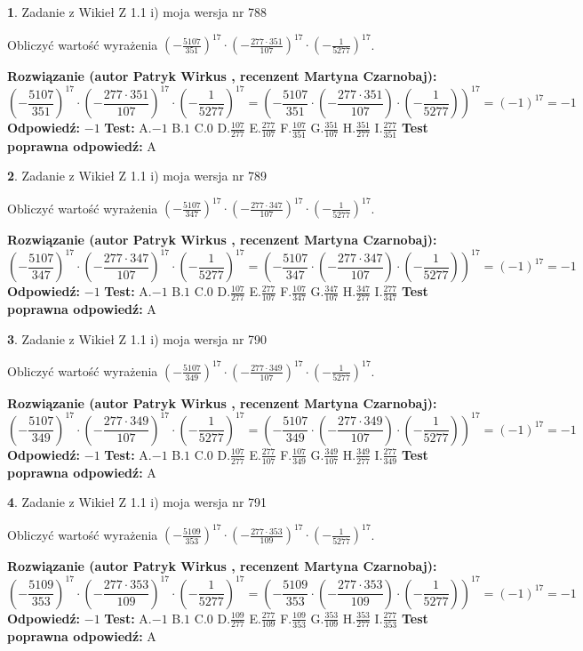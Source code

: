 \documentclass[12pt, a4paper]{article}
\theoremstyle{definition} %
\newtheorem{zad}{}
\newcommand{\zadStart}[1]{\begin{zad}#1\newline}
\newcommand{\zadStop}{\end{zad}}
\newcommand{\rozwStart}[2]{\noindent \textbf{Rozwiązanie (autor #1 , recenzent #2): }\newline}
\newcommand{\rozwStop}{\newline}
\newcommand{\odpStart}{\noindent \textbf{Odpowiedź:}\newline}
\newcommand{\odpStop}{\newline}
\newcommand{\testStart}{\noindent \textbf{Test:}\newline}
\newcommand{\testStop}{\newline}
\newcommand{\kluczStart}{\noindent \textbf{Test poprawna odpowiedź:}\newline}
\newcommand{\kluczStop}{\newline}
\begin{document}
\zadStart{Zadanie z Wikieł Z 1.1 i) moja wersja nr 788}

Obliczyć wartość wyrażenia $(-\frac{5107}{351})^{17} \cdot (-\frac{277 \cdot 351}{107})^{17} \cdot (-\frac{1}{5277})^{17}$.
\zadStop
\rozwStart{Patryk Wirkus}{Martyna Czarnobaj}
$$(-\frac{5107}{351})^{17} \cdot (-\frac{277 \cdot 351}{107})^{17} \cdot (-\frac{1}{5277})^{17} = (-\frac{5107}{351} \cdot (-\frac{277 \cdot 351}{107}) \cdot (-\frac{1}{5277}))^{17} = (-1)^{17} = -1$$
\rozwStop
\odpStart
$-1$
\odpStop
\testStart
A.$-1$ B.$1$ C.$0$ D.$\frac{107}{277}$ E.$\frac{277}{107}$
F.$\frac{107}{351}$ G.$\frac{351}{107}$
H.$\frac{351}{277}$
I.$\frac{277}{351}$
\testStop
\kluczStart
A
\kluczStop



\zadStart{Zadanie z Wikieł Z 1.1 i) moja wersja nr 789}

Obliczyć wartość wyrażenia $(-\frac{5107}{347})^{17} \cdot (-\frac{277 \cdot 347}{107})^{17} \cdot (-\frac{1}{5277})^{17}$.
\zadStop
\rozwStart{Patryk Wirkus}{Martyna Czarnobaj}
$$(-\frac{5107}{347})^{17} \cdot (-\frac{277 \cdot 347}{107})^{17} \cdot (-\frac{1}{5277})^{17} = (-\frac{5107}{347} \cdot (-\frac{277 \cdot 347}{107}) \cdot (-\frac{1}{5277}))^{17} = (-1)^{17} = -1$$
\rozwStop
\odpStart
$-1$
\odpStop
\testStart
A.$-1$ B.$1$ C.$0$ D.$\frac{107}{277}$ E.$\frac{277}{107}$
F.$\frac{107}{347}$ G.$\frac{347}{107}$
H.$\frac{347}{277}$
I.$\frac{277}{347}$
\testStop
\kluczStart
A
\kluczStop



\zadStart{Zadanie z Wikieł Z 1.1 i) moja wersja nr 790}

Obliczyć wartość wyrażenia $(-\frac{5107}{349})^{17} \cdot (-\frac{277 \cdot 349}{107})^{17} \cdot (-\frac{1}{5277})^{17}$.
\zadStop
\rozwStart{Patryk Wirkus}{Martyna Czarnobaj}
$$(-\frac{5107}{349})^{17} \cdot (-\frac{277 \cdot 349}{107})^{17} \cdot (-\frac{1}{5277})^{17} = (-\frac{5107}{349} \cdot (-\frac{277 \cdot 349}{107}) \cdot (-\frac{1}{5277}))^{17} = (-1)^{17} = -1$$
\rozwStop
\odpStart
$-1$
\odpStop
\testStart
A.$-1$ B.$1$ C.$0$ D.$\frac{107}{277}$ E.$\frac{277}{107}$
F.$\frac{107}{349}$ G.$\frac{349}{107}$
H.$\frac{349}{277}$
I.$\frac{277}{349}$
\testStop
\kluczStart
A
\kluczStop



\zadStart{Zadanie z Wikieł Z 1.1 i) moja wersja nr 791}

Obliczyć wartość wyrażenia $(-\frac{5109}{353})^{17} \cdot (-\frac{277 \cdot 353}{109})^{17} \cdot (-\frac{1}{5277})^{17}$.
\zadStop
\rozwStart{Patryk Wirkus}{Martyna Czarnobaj}
$$(-\frac{5109}{353})^{17} \cdot (-\frac{277 \cdot 353}{109})^{17} \cdot (-\frac{1}{5277})^{17} = (-\frac{5109}{353} \cdot (-\frac{277 \cdot 353}{109}) \cdot (-\frac{1}{5277}))^{17} = (-1)^{17} = -1$$
\rozwStop
\odpStart
$-1$
\odpStop
\testStart
A.$-1$ B.$1$ C.$0$ D.$\frac{109}{277}$ E.$\frac{277}{109}$
F.$\frac{109}{353}$ G.$\frac{353}{109}$
H.$\frac{353}{277}$
I.$\frac{277}{353}$
\testStop
\kluczStart
A
\kluczStop
\end{document}
